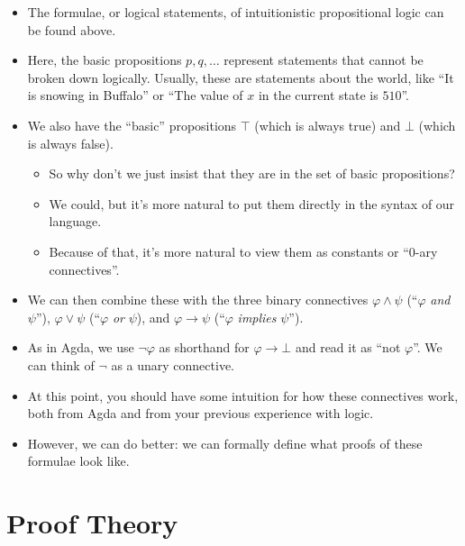 \documentclass{lecturenotes}
\begin{document}
\begin{itemize}
\item The formulae, or logical statements, of intuitionistic propositional logic can be found above.
\item Here, the basic propositions $p, q, \dots$ represent statements that cannot be broken down logically.
  Usually, these are statements about the world, like ``It is snowing in Buffalo'' or ``The value of $x$ in the current state is $510$''.
\item We also have the ``basic'' propositions $\top$ (which is always true) and $\bot$ (which is always false).
  \begin{itemize}
  \item So why don't we just insist that they are in the set of basic propositions?
  \item We could, but it's more natural to put them directly in the syntax of our language.
  \item Because of that, it's more natural to view them as constants or ``$0$-ary connectives''.
  \end{itemize}
\item We can then combine these with the three binary connectives $\varphi \land \psi$ (``$\varphi$ \emph{and} $\psi$''), $\varphi \lor \psi$ (``$\varphi$ \emph{or} $\psi$), and $\varphi \to \psi$ (``$\varphi$ \emph{implies} $\psi$'').
\item As in Agda, we use $\lnot \varphi$ as shorthand for $\varphi \to \bot$ and read it as ``not $\varphi$''.
  We can think of $\lnot$ as a unary connective.
\item At this point, you should have some intuition for how these connectives work, both from Agda and from your previous experience with logic.
\item However, we can do better: we can formally define what proofs of these formulae look like.
\end{itemize}

\section{Proof Theory}
\label{sec:proof-theory}
\end{document}
